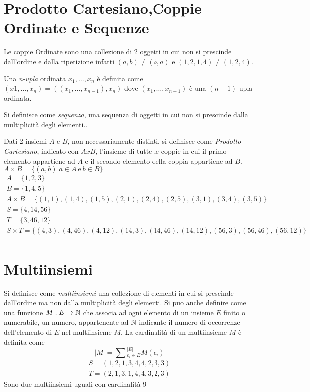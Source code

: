 \section{Prodotto Cartesiano,Coppie Ordinate e Sequenze}
Le coppie Ordinate sono una collezione di 2 oggetti in cui non si prescinde
dall'ordine e dalla ripetizione infatti $(a,b) \neq (b,a)$ e $(1,2,1,4) \neq (1,2,4)$.

Una \emph{n-upla} ordinata $x_1,\dots,x_n$ è definita come $(x1,\dots,x_n) = ( (x_1,\dots,x_{n-1}),x_n)$
dove $(x_1,\dots,x_{n-1})$ è una $(n-1)$-upla ordinata.

Si definisce come \emph{sequenza}, una sequenza di oggetti in cui non si prescinde
dalla multiplicità degli elementi..

Dati 2 insiemi $A$ e $B$, non necessariamente  distinti, si definisce come \textit{Prodotto Cartesiano},
indicato con $A x B$, l'insieme di tutte le coppie in cui il primo elemento appartiene ad $A$
e il secondo elemento della coppia appartiene ad $B$.\newline
$A \times B = \{(a,b) | a \in A \ \text{e} \ b \in B\} $
\begin{align*}
A = \{1,2,3\} \\
B = \{1,4,5\} \\
A \times B = \{(1,1),(1,4),(1,5),(2,1),(2,4),(2,5),(3,1),(3,4),(3,5)\} \\
S = \{ 4,14,56 \} \\
T = \{ 3,46,12 \} \\
S \times T = \{(4,3),(4,46),(4,12),(14,3),(14,46),(14,12),(56,3),(56,46),(56,12) \} \\
\end{align*}

\section{Multiinsiemi}
Si definisce come \emph{multiinsiemi} una collezione di elementi in cui si prescinde
dall'ordine ma non dalla multiplicità degli elementi.\newline
Si puo anche definire come una funzione $M:E \mapsto \mathbb{N}$ che associa ad ogni elemento
di un insieme $E$ finito o numerabile, un numero, appartenente ad $\mathbb{N}$ indicante
il numero di occorrenze dell'elemento di $E$ nel multiinsieme $M$.\newline
La cardinalità di un multiinsieme $M$ è definita come
\begin{equation*}
\displaystyle |M| = \sum{_{e_i \in E} ^ {|E|}} M(e_i)
\end{equation*}
\begin{align*}
S = (1,2,1,3,4,4,2,3,3) \\
T = (2,1,3,1,4,4,3,2,3)
\end{align*}
Sono due multiinsiemi uguali con cardinalità 9

